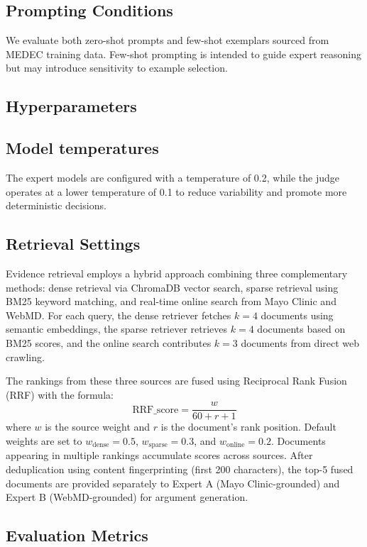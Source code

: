 \documentclass[11pt]{article}
\begin{document}
\subsection{Prompting Conditions}

We evaluate both zero-shot prompts and few-shot exemplars sourced from MEDEC training data. Few-shot prompting is intended to guide expert reasoning but may introduce sensitivity to example selection.

\subsection{Hyperparameters}
\subsection{Model temperatures}
The expert models are configured with a temperature of 0.2, while the judge operates at a lower temperature of 0.1 to reduce variability and promote more deterministic decisions.
\subsection{Retrieval Settings}
Evidence retrieval employs a hybrid approach combining three complementary methods: dense retrieval via ChromaDB vector search, sparse retrieval using BM25 keyword matching, and real-time online search from Mayo Clinic and WebMD. For each query, the dense retriever fetches $k=4$ documents using semantic embeddings, the sparse retriever retrieves $k=4$ documents based on BM25 scores, and the online search contributes $k=3$ documents from direct web crawling.

The rankings from these three sources are fused using Reciprocal Rank Fusion (RRF) with the formula:
\begin{equation}
    \text{RRF\_score} = \frac{w}{60 + r + 1}
\end{equation}
where $w$ is the source weight and $r$ is the document's rank position. Default weights are set to $w_{\text{dense}}=0.5$, $w_{\text{sparse}}=0.3$, and $w_{\text{online}}=0.2$. Documents appearing in multiple rankings accumulate scores across sources. After deduplication using content fingerprinting (first 200 characters), the top-5 fused documents are provided separately to Expert A (Mayo Clinic-grounded) and Expert B (WebMD-grounded) for argument generation.

\subsection{Evaluation Metrics}
\end{document}
